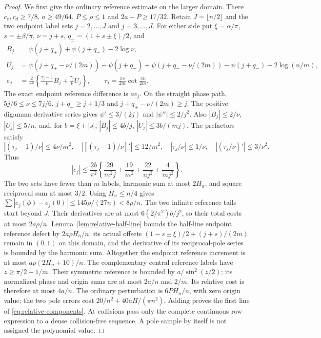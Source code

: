 \begin{proof}
We first give the ordinary reference estimate on the larger domain.
There $c_e,c_d\geq7/8$, $a\geq49/64$, $P\leq\rho\leq1$ and
$2a-P\geq17/32$. Retain $J=\lfloor n/2\rfloor$ and the two
endpoint label sets $j=2,\ldots,J$ and $j=3,\ldots,J$.
For either side put $\xi=\alpha/\pi$, $s=\pm\beta/\pi$,
$\nu=j+s$, $q_\pm=(1+s\pm\xi)/2$, and
\begin{align*}
 B_j&=\psi(j+q_+)+\psi(j+q_-)-2\log\nu,\\
 U_j&=\psi(j+q_+-\nu/(2m))-\psi(j+q_+)
       +\psi(j+q_--\nu/(2m))-\psi(j+q_-)-2\log(n/m),\\
 e_j&=\frac2{\pi^2}\left\{
  \frac{\tau_j-1}\nu B_j+\frac{\tau_j}\nu U_j\right\},
 \qquad \tau_j=\frac{\pi\nu}{2m}\cot\frac{\pi\nu}{2m}.
\end{align*}
The exact endpoint reference difference is $ae_j$. On the straight
phase path, $5j/6\leq\nu\leq7j/6$, $j+q_\pm\geq j+1/3$ and
$j+q_\pm-\nu/(2m)\geq j$. The positive digamma derivative series
gives $\psi'\leq3/(2j)$ and $|\psi''|\leq2/j^2$.
Also $|B_j|\leq2/\nu$, $|U_j|\leq5/n$, and, for
$b=\xi+|s|$, $|\dot B_j|\leq4b/j$,
$|\dot U_j|\leq3b/(mj)$. The prefactors satisfy
\[
 |(\tau_j-1)/\nu|\leq4\nu/m^2,\quad
 |[(\tau_j-1)/\nu]'|\leq12/m^2,\quad
 |\tau_j/\nu|\leq1/\nu,\quad
 |(\tau_j/\nu)'|\leq3/\nu^2.
\]
Thus
\[
 |\dot e_j|\leq\frac{2b}{\pi^2}
 \left\{\frac{29}{m^2j}+\frac{19}{m^2}
                       +\frac{22}{nj^2}+\frac4{mj^2}\right\}.
\]
The two sets have fewer than $m$ labels, harmonic sum at most $2H_n$,
and square reciprocal sum at most $3/2$. Using $H_n\leq n/4$ gives
$\sum|e_j(\phi)-e_j(0)|\leq145\rho/(27n)<8\rho/n$.
The two infinite reference tails start beyond $J$. Their derivatives
are at most $6(2/\pi^2)b/j^2$, so their total costs at most
$2a\rho/n$. Lemma~\ref{lem:relative-half-line} bounds the half-line
endpoint reference defect by $2a\rho H_n/n$: its actual offsets
$(1-s\pm\xi)/2+(j+s)/(2m)$ remain in $(0,1)$ on this domain,
and the derivative of its reciprocal-pole series is bounded by the
harmonic sum. Altogether the endpoint reference increment is at most
$a\rho(2H_n+10)/n$.
The complementary central reference labels have $z\geq\pi/2-1/m$.
Their symmetric reference is bounded by $a/\sin^2(z/2)$; its
normalized phase and origin sums are at most $2a/n$ and $2/m$.
Its relative cost is therefore at most $4a/n$.
The ordinary perturbation is $6PH_n/n$, with zero origin value;
the two pole errors cost $20/n^2+40aH/(\pi n^2)$.
Adding proves the first line of \eqref{eq:relative-components}.
At collisions pass only the complete continuous row expression to a
dense collision-free sequence. A pole sample by itself is not assigned
the polynomial value.


\end{proof}
